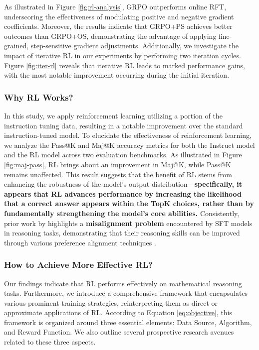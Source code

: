 \begin{itemize}[topsep=0pt]
\begin{itemize}[topsep=0pt]
As illustrated in Figure \ref{fig:rl-analysis}, GRPO outperforms online RFT, underscoring the effectiveness of modulating positive and negative gradient coefficients. Moreover, the results indicate that GRPO+PS achieves better outcomes than GRPO+OS, demonstrating the advantage of applying fine-grained, step-sensitive gradient adjustments. Additionally, we investigate the impact of iterative RL in our experiments by performing two iteration cycles. Figure \ref{fig:iter-rl} reveals that iterative RL leads to marked performance gains, with the most notable improvement occurring during the initial iteration.

\subsubsection{Why RL Works?} In this study, we apply reinforcement learning utilizing a portion of the instruction tuning data, resulting in a notable improvement over the standard instruction-tuned model. To elucidate the effectiveness of reinforcement learning, we analyze the Pass@K and Maj@K accuracy metrics for both the Instruct model and the RL model across two evaluation benchmarks. As illustrated in Figure \ref{fig:maj-pass}, RL brings about an improvement in Maj@K, while Pass@K remains unaffected. This result suggests that the benefit of RL stems from enhancing the robustness of the model's output distribution—\textbf{specifically, it appears that RL advances performance by increasing the likelihood that a correct answer appears within the TopK choices, rather than by fundamentally strengthening the model’s core abilities.} Consistently, prior work by \citep{wang2023making} highlights a \textbf{misalignment problem} encountered by SFT models in reasoning tasks, demonstrating that their reasoning skills can be improved through various preference alignment techniques \citep{yuan2023rrhf,song2023preference,wang2023making}.

\subsubsection{How to Achieve More Effective RL?}
\label{sec:effec_rl}
Our findings indicate that RL performs effectively on mathematical reasoning tasks. Furthermore, we introduce a comprehensive framework that encapsulates various prominent training strategies, reinterpreting them as direct or approximate applications of RL. According to Equation \ref{eq:objective}, this framework is organized around three essential elements: Data Source, Algorithm, and Reward Function. We also outline several prospective research avenues related to these three aspects.


\end{itemize}
\end{itemize}
